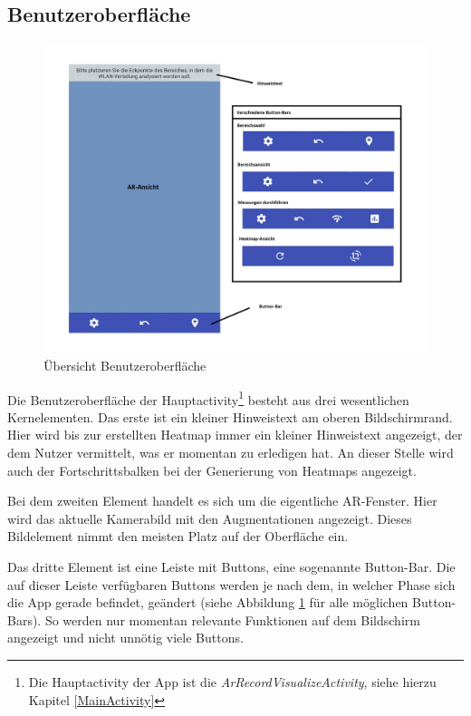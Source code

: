 \documentclass[10pt]{scrartcl}
\begin{document}
\subsection{Benutzeroberfläche}
\label{UI}
\begin{figure}
\centering
\includegraphics[scale=0.4]{images/ui.jpg}
\caption{\label{img:ui}Übersicht Benutzeroberfläche}
\end{figure}
Die Benutzeroberfläche der Hauptactivity\footnote{Die Hauptactivity der App ist die \textit{ArRecordVisualizeActivity}, siehe hierzu Kapitel \ref{MainActivity}} besteht aus drei wesentlichen Kernelementen. Das erste ist ein kleiner Hinweistext am oberen Bildschirmrand. Hier wird bis zur erstellten Heatmap immer ein kleiner Hinweistext angezeigt, der dem Nutzer vermittelt, was er momentan zu erledigen hat. An dieser Stelle wird auch der Fortschrittsbalken bei der Generierung von Heatmaps angezeigt.

Bei dem zweiten Element handelt es sich um die eigentliche AR-Fenster. Hier wird das aktuelle Kamerabild mit den Augmentationen angezeigt. Dieses Bildelement nimmt den meisten Platz auf der Oberfläche ein.

Das dritte Element ist eine Leiste mit Buttons, eine sogenannte Button-Bar. Die auf dieser Leiste verfügbaren Buttons werden je nach dem, in welcher Phase sich die App gerade befindet, geändert (siehe Abbildung \ref{img:ui} für alle möglichen Button-Bars). So werden nur momentan relevante Funktionen auf dem Bildschirm angezeigt und nicht unnötig viele Buttons.
\end{document}
